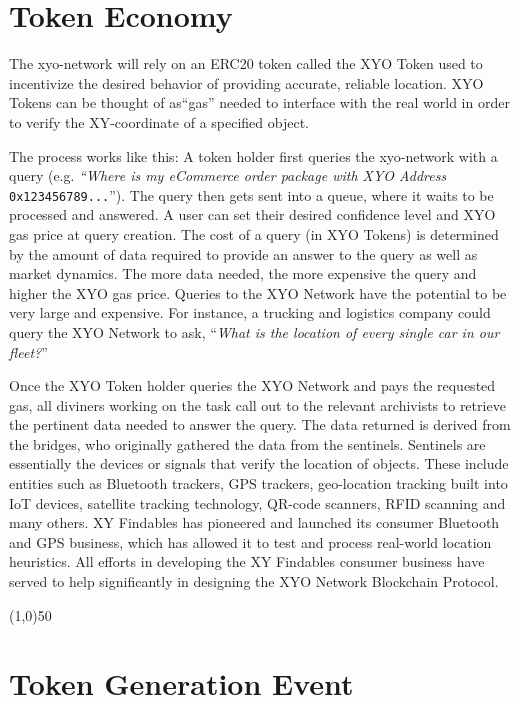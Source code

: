 \documentclass{article}
\begin{document}
\section{Token Economy}

The \Gls{xyo-network} will rely on an ERC20 token called the XYO Token used to incentivize the desired behavior of providing accurate, reliable location. XYO Tokens can be thought of as``gas'' needed to interface with the real world in order to verify the XY-coordinate of a specified object.

The process works like this: A token holder first queries the \Gls{xyo-network} with a query (e.g. \textit{``Where is my eCommerce order package with XYO Address} \texttt{0x123456789...}''). The query then gets sent into a queue, where it waits to be processed and answered. A user can set their desired confidence level and XYO gas price at query creation. The cost of a query (in XYO Tokens) is determined by the amount of data required to provide an answer to the query as well as market dynamics.  The more data needed, the more expensive the query and higher the XYO gas price. Queries to the XYO Network have the potential to be very large and expensive. For instance, a trucking and logistics company could query the XYO Network to ask, ``\textit{What is the location of every single car in our fleet?}''

Once the XYO Token holder queries the XYO Network and pays the requested gas, all \Glspl{diviner} working on the task call out to the relevant \Glspl{archivist} to retrieve the pertinent data needed to answer the query. The data returned is derived from the \Glspl{bridge}, who originally gathered the data from the \Glspl{sentinel}. Sentinels are essentially the devices or signals that verify the location of objects. These include entities such as Bluetooth trackers, GPS trackers, geo-location tracking built into IoT devices, satellite tracking technology, QR-code scanners, RFID scanning and many others. XY Findables has pioneered and launched its consumer Bluetooth and GPS business, which has allowed it to test and process real-world location \glspl{heuristic}. All efforts in developing the XY Findables consumer business have served to help significantly in designing the XYO Network Blockchain Protocol.

\begin{center}
\line(1,0){50}
\end{center}

\section{Token Generation Event}
\end{document}
